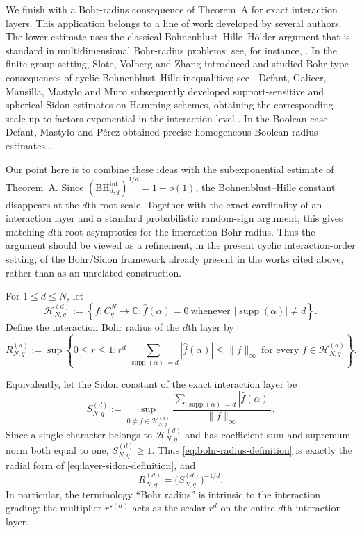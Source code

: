 \documentclass[11pt,a4paper]{article}
\numberwithin{equation}{section}
\theoremstyle{cleanplain}
\theoremstyle{cleandefinition}
\theoremstyle{cleanremark}
\newcommand{\C}{\mathbb C}
\newcommand{\supp}{\operatorname{supp}}
\newcommand{\BHint}[2]{\mathrm{BH}^{\mathrm{int}}_{#1,#2}}
\begin{document}
{\color{black}
We finish with a Bohr-radius consequence of Theorem~A for exact interaction
layers.  This application belongs to a line of work developed by several
authors.  The lower estimate uses the classical Bohnenblust--Hille--H\"older
argument that is standard in multidimensional Bohr-radius problems; see, for
instance, \cite{BPSS}.  In the finite-group setting, Slote, Volberg and Zhang
introduced and studied Bohr-type consequences of cyclic Bohnenblust--Hille
inequalities; see \cite[Section~4.2]{SVZ}.  Defant, Galicer, Mansilla,
Masty\l o and Muro subsequently developed support-sensitive and spherical
Sidon estimates on Hamming schemes, obtaining the corresponding scale up to
factors exponential in the interaction level
\cite[Theorem~3.3]{DGMMM}.  In the Boolean case, Defant, Masty\l o and
P\'erez obtained precise homogeneous Boolean-radius estimates
\cite[Theorem~3.1]{DMPBohr}.

Our point here is to combine these ideas with the subexponential estimate of
Theorem~A.  Since $(\BHint{d}{q})^{1/d}=1+o(1)$, the Bohnenblust--Hille
constant disappears at the $d$th-root scale.  Together with the exact
cardinality of an interaction layer and a standard probabilistic random-sign
argument, this gives matching $d$th-root asymptotics for the interaction
Bohr radius.  Thus the argument should be viewed as a refinement, in the
present cyclic interaction-order setting, of the Bohr/Sidon framework already
present in the works cited above, rather than as an unrelated construction.}

For $1\leq d\leq N$, let
\[
 \mathcal H_{N,q}^{(d)}
 :=\left\{f:C_q^N\to\C:
 \widehat f(\alpha)=0\ \text{whenever }|\supp(\alpha)|\neq d\right\}.
\]
Define the interaction Bohr radius of the $d$th layer by
\begin{equation}\label{eq:bohr-radius-definition}
 R_{N,q}^{(d)}
 :=\sup\left\{0\leq r\leq1:
 r^d\sum_{|\supp(\alpha)|=d}|\widehat f(\alpha)|
 \leq\|f\|_\infty
 \ \text{for every }f\in\mathcal H_{N,q}^{(d)}\right\}.
\end{equation}

Equivalently, let the Sidon constant of the exact interaction layer be
\begin{equation}\label{eq:layer-sidon-definition}
 S_{N,q}^{(d)}
 :=\sup_{0\neq f\in\mathcal H_{N,q}^{(d)}}
 \frac{\displaystyle\sum_{|\supp(\alpha)|=d}|\widehat f(\alpha)|}
      {\|f\|_\infty}.
\end{equation}
Since a single character belongs to \(\mathcal H_{N,q}^{(d)}\) and has
coefficient sum and supremum norm both equal to one, \(S_{N,q}^{(d)}\geq1\).
Thus \eqref{eq:bohr-radius-definition} is exactly the radial form of
\eqref{eq:layer-sidon-definition}, and
\begin{equation}\label{eq:bohr-sidon-identity}
 \boxed{R_{N,q}^{(d)}=\bigl(S_{N,q}^{(d)}\bigr)^{-1/d}.}
\end{equation}
In particular, the terminology ``Bohr radius'' is intrinsic to the
interaction grading: the multiplier $r^{s(\alpha)}$ acts as the scalar $r^d$
on the entire $d$th interaction layer.
\end{document}
